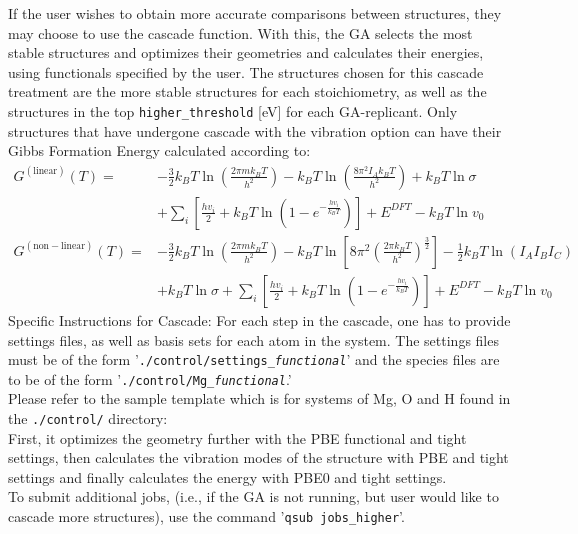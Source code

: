 If the user wishes to obtain more accurate comparisons between structures, they may choose to use the cascade function. With this, the GA selects the most stable structures and optimizes their geometries and calculates their energies, using functionals specified by the user. The structures chosen for this cascade treatment are the more stable structures for each stoichiometry, as well as the structures in the top \texttt{higher\_threshold} [eV] for each GA-replicant. Only structures that have undergone cascade with the vibration option can have their Gibbs Formation Energy calculated according to:\\
\begin{align*}
G^{\mathrm {(linear)}}(T) = &-\frac{3}{2}k_{B}T \ln\left(\frac{2{\pi}mk_{B}T}{h^{2}}\right)
-k_{B}T\ln\left(\frac{8{\pi^{2}}I_{A}k_{B}T}{h^{2}}\right) + k_{B}T\ln\sigma\\
&+ \sum_{i}^{} \left[\frac{hv_{i}}{2} + k_{B}T\ln\left(1 - e^{-\frac{hv_{i}}{k_{B}T}}\right)\right]
+ E^{DFT} - k_{B}T\ln v_{0}\\
G^{\mathrm {(non-linear)}}(T) = &-\frac{3}{2}k_{B}T\ln\left(\frac{2{\pi}mk_{B}T}{h^{2}}\right)
 - k_{B}T\ln\left[8{\pi}^{2}\left(\frac{2{\pi}k_{B}T}{h^{2}}\right)^{\frac{3}{2}}\right]
 - \frac{1}{2}k_{B}T\ln(I_{A}I_{B}I_{C})\\
 &+ k_{B}T\ln\sigma
+ \sum_{i}^{} \left[\frac{hv_{i}}{2} + k_{B}T\ln\left(1 - e^{-\frac{hv_{i}}{k_{B}T}}\right)\right]
+ E^{DFT}
- k_{B}T\ln v_{0}
\end{align*}
\newline
\newline
Specific Instructions for Cascade: For each step in the cascade, one has to provide settings files, as well as basis sets for each atom in the system. The settings files must be of the form '\texttt{./control/settings\_{\em functional}}' and the species files are to be of the form '\texttt{./control/Mg\_{\em functional}}.' \\
Please refer to the sample template which is for systems of Mg, O and H found in the \texttt{./control/} directory:\\
First, it optimizes the geometry further with the PBE functional and tight settings, then calculates the vibration modes of the structure with PBE and tight settings and finally calculates the energy with PBE0 and tight settings.\\
To submit additional jobs, (i.e., if the GA is not running, but user would like to cascade more structures), use the command '\texttt{qsub jobs\_higher}'.

